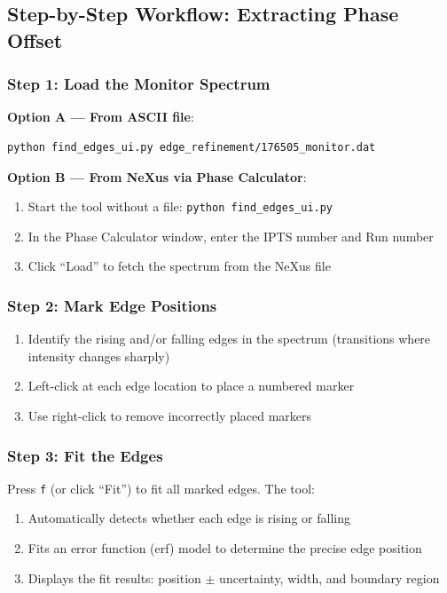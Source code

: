\documentclass[tm]{ornltm}
\begin{document}
\subsection{Step-by-Step Workflow: Extracting Phase Offset}

\subsubsection{Step 1: Load the Monitor Spectrum}

\textbf{Option A --- From ASCII file}:
\begin{lstlisting}[language=bash]
python find_edges_ui.py edge_refinement/176505_monitor.dat
\end{lstlisting}

\textbf{Option B --- From NeXus via Phase Calculator}:
\begin{enumerate}
    \item Start the tool without a file: \texttt{python find\_edges\_ui.py}
    \item In the Phase Calculator window, enter the IPTS number and Run number
    \item Click ``Load'' to fetch the spectrum from the NeXus file
\end{enumerate}

\subsubsection{Step 2: Mark Edge Positions}

\begin{enumerate}
    \item Identify the rising and/or falling edges in the spectrum (transitions where intensity changes sharply)
    \item Left-click at each edge location to place a numbered marker
    \item Use right-click to remove incorrectly placed markers
\end{enumerate}

\subsubsection{Step 3: Fit the Edges}

Press \texttt{f} (or click ``Fit'') to fit all marked edges. The tool:
\begin{enumerate}
    \item Automatically detects whether each edge is rising or falling
    \item Fits an error function (erf) model to determine the precise edge position
    \item Displays the fit results: position $\pm$ uncertainty, width, and boundary region
\end{enumerate}
\end{document}
